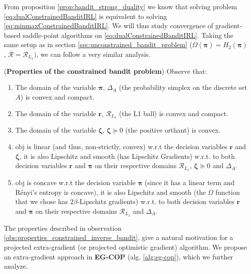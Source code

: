 \noindent
From proposition \ref{prop:bandit_strong_duality} we know that solving problem \ref{eq:dualConstrainedBanditIRL} is equivalent to solving \ref{eq:minmaxConstrainedBanditIRL}. We will thus study convergence of gradient-based saddle-point algorithms on \ref{eq:dualConstrainedBanditIRL}. Taking the same setup as in section \ref{sec:unconstrained_bandit_problem} ($\Omega(\bm{\pi}) = H_2(\bm{\pi})$, $\mathcal{R}=\mathcal{R}_{L_1})$, we can follow a very similar analysis.

\begin{observation}
    \label{obs:properties_constrained_inverse_bandit}
    (\textbf{Properties of the constrained bandit problem}) Observe that:
    \begin{enumerate}
        \item The domain of the variable $\bm{\pi}$, $\Delta_A$ (the probability simplex on the discrete set $A$) is convex and compact.
        \item The domain of the variable $\bm{r}$, $\mathcal{R}_{L_1}$ (the L1 ball) is convex and compact.
        \item The domain of the variable $\bm{\zeta}$, $\bm{\zeta}\succcurlyeq 0$ (the positive orthant) is convex.
        \item $\text{obj}$ is {linear} (and thus, non-strictly, convex) w.r.t the decision variables $\bm{r}$ and $\bm{\zeta}$, it is also Lipschitz and smooth (has  Lipschitz Gradients) w.r.t. to both decision variables  $\bm{r}$ and $\bm{\pi}$ on their respective domains $\mathcal{R}_{L_1}$, $\bm{\zeta}\succcurlyeq 0$ and $\Delta_A$.
        \item $\text{obj}$ is concave w.r.t the decision variable $\bm{\pi}$ (since it has a linear term and Rényi's entropy is concave), it is also Lipschitz and smooth (the $\Omega$ function that we chose has $2\beta$-Lipschitz gradients) w.r.t. to both decision variables  $\bm{r}$ and $\bm{\pi}$ on their respective domains $\mathcal{R}_{L_1}$ and $\Delta_A$.
    \end{enumerate}
\end{observation}

The properties described in observation \ref{obs:properties_constrained_inverse_bandit}, give a natural motivation for a projected extra-gradient (or projected optimistic gradient) algorithm. We propose an extra-gradient approach in \textbf{EG-COP} (alg. \ref{alg:eg-cop}), which we further analyze.

